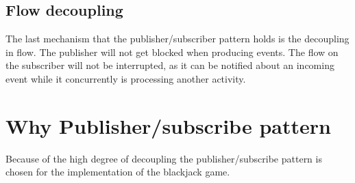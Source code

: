 \FloatBarrier

\subsection{Flow decoupling}
The last mechanism that the publisher/subscriber pattern holds is the decoupling in flow. The publisher will not get blocked when producing events. The flow on the subscriber will not be interrupted, as it can be notified about an incoming event while it concurrently is processing another activity.

\section{Why Publisher/subscribe pattern}
Because of the high degree of decoupling the publisher/subscribe pattern is chosen for the implementation of the blackjack game. 